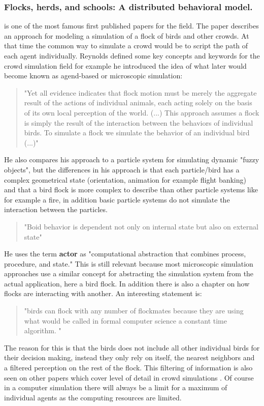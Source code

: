 \documentclass[sigconf]{acmart}
\begin{document}
\subsubsection{Flocks, herds, and schools: A distributed behavioral model.}\cite{reynolds_flocks_1987}
is one of the most famous first published papers for the field. The paper describes an approach for modeling a simulation of a flock of birds and other crowds. At that time the common way to simulate a crowd would be to script the path of each agent individually. Reynolds defined some key concepts and keywords for the crowd simulation field for example he introduced the idea of what later would become known as agend-based or microscopic simulation:
\begin{quote}
"Yet all evidence indicates that flock motion must be merely the aggregate result of the actions of individual animals, each acting solely on the basis of its own local perception of the world. (...) This approach assumes a flock is simply the result of the interaction between the behaviors of individual birds. To simulate a flock we simulate the behavior of an individual bird (...)"
\end{quote}
He also compares his approach to a particle system for simulating dynamic "fuzzy objects", but the differences in his approach is that each particle/bird has a complex geometrical state (orientation, animation for example flight banking) and that a bird flock is more complex to describe than other particle systems like for example a fire, in addition basic particle systems do not simulate the interaction between the particles.  
\begin{quote}
"Boid behavior is dependent not only on internal state but also on external state"
\end{quote}
He uses the term \textbf{actor} as "computational abstraction that combines process, procedure, and state." This is still relevant because most microscopic simulation approaches use a similar concept for abstracting the simulation system from the actual application, here a bird flock.  
In addition there is also a chapter on how flocks are interacting with another. An interesting statement is: 
\begin{quote}
"birds can flock with any number of flockmates because they are using what would be called in formal computer science a constant time algorithm. "
\end{quote}
The reason for this is that the birds does not include all other individual birds for their decision making, instead they only rely on itself, the nearest neighbors and a filtered perception on the rest of the flock. This  filtering of  information is also seen on other papers which cover level of detail in crowd simulations \cite{osullivan_levels_2002}. Of course in a computer simulation there will always be a limit for a maximum of individual agents as the computing resources are limited. 
\end{document}
